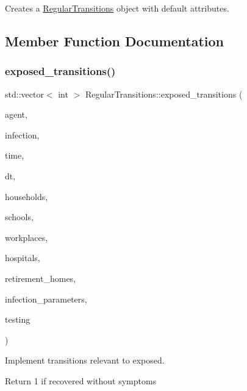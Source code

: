 Creates a \hyperlink{classRegularTransitions}{Regular\+Transitions} object with default attributes. 



\subsection{Member Function Documentation}
\mbox{\label{classRegularTransitions_a7ca3a68bfecd66d831b9daf9e467b930}} 
\subsubsection{\texorpdfstring{exposed\+\_\+transitions()}{exposed\_transitions()}}
{\footnotesize\ttfamily std\+::vector$<$ int $>$ Regular\+Transitions\+::exposed\+\_\+transitions (\begin{DoxyParamCaption}\item[{\hyperlink{classAgent}{Agent} \&}]{agent,  }\item[{\hyperlink{classInfection}{Infection} \&}]{infection,  }\item[{const double}]{time,  }\item[{const double}]{dt,  }\item[{std\+::vector$<$ \hyperlink{classHousehold}{Household} $>$ \&}]{households,  }\item[{std\+::vector$<$ \hyperlink{classSchool}{School} $>$ \&}]{schools,  }\item[{std\+::vector$<$ \hyperlink{classWorkplace}{Workplace} $>$ \&}]{workplaces,  }\item[{std\+::vector$<$ \hyperlink{classHospital}{Hospital} $>$ \&}]{hospitals,  }\item[{std\+::vector$<$ \hyperlink{classRetirementHome}{Retirement\+Home} $>$ \&}]{retirement\+\_\+homes,  }\item[{const std\+::map$<$ std\+::string, double $>$ \&}]{infection\+\_\+parameters,  }\item[{const \hyperlink{classTesting}{Testing} \&}]{testing }\end{DoxyParamCaption})}



Implement transitions relevant to exposed. 

Return 1 if recovered without symptoms \mbox{\label{classRegularTransitions_a56dfcdad1824424a61177af9cfc71774}} 
